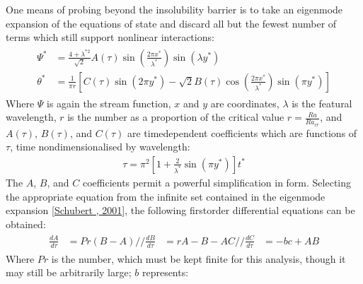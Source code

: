 \documentclass[letterpaper,10pt,english]{jupyterBook}
\begin{document}
\sphinxAtStartPar
One means of probing beyond the insolubility barrier is to take an eigenmode expansion of the equations of state and discard all but the fewest number of terms which still support nonlinear interactions:
\begin{equation*}
\begin{split} \begin{align*}
\Psi^* &= \frac{4 + \lambda^{*2}}{\sqrt{2}} A(\tau) \sin \left( \frac{2 \pi x^*}{\lambda^*} \right) \sin \left( \lambda y^* \right) \\
\theta^* &= \frac{1}{\pi r} \left[ C(\tau) \sin \left( 2 \pi y^* \right) - \sqrt{2} B(\tau) \cos \left( \frac{2 \pi x^*}{\lambda^*} \right) \sin \left( \pi y^* \right) \right]
\end{align*} \end{split}
\end{equation*}
\sphinxAtStartPar
Where \(\Psi\) is again the stream function, \(x\) and \(y\) are coordinates, \(\lambda\) is the featural wavelength, \(r\) is the  number as a proportion of the critical value \(r = \frac{Ra}{Ra_{cr}}\), and \(A(\tau)\), \(B(\tau)\), and \(C(\tau)\) are time\sphinxhyphen{}dependent coefficients which are functions of \(\tau\), time non\sphinxhyphen{}dimensionalised by wavelength:
\begin{equation*}
\begin{split} \tau = \pi^2 \left[ 1 + \frac{2}{\lambda^*} \sin \left( \pi y^* \right) \right] t^* \end{split}
\end{equation*}
\sphinxAtStartPar
The \(A\), \(B\), and \(C\) coefficients permit a powerful simplification in form. Selecting the appropriate equation from the infinite set contained in the eigenmode expansion {[}\hyperlink{cite.references:id663}{Schubert , 2001}{]}, the following first\sphinxhyphen{}order differential equations can be obtained:
\begin{equation*}
\begin{split} \begin{align*}
\frac{d A}{d \tau} &= Pr \left( B - A \right) //
\frac{d B}{d \tau} &= rA - B - AC //
\frac{d C}{d \tau} &= -bc + AB
\end{align*} \end{split}
\end{equation*}
\sphinxAtStartPar
Where \(Pr\) is the  number, which must be kept finite for this analysis, though it may still be arbitrarily large; \(b\) represents:
\end{document}
